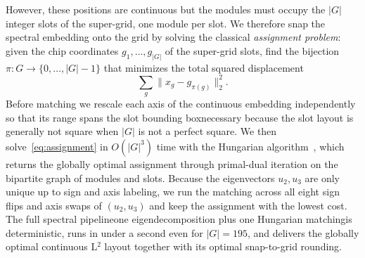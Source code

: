 However, these positions are continuous but the modules must occupy the $|G|$ integer slots of the super-grid, one module per slot. We therefore snap the spectral embedding onto the grid by solving the classical \emph{assignment problem}: given the chip coordinates $g_1, \ldots, g_{|G|}$ of the super-grid slots, find the bijection $\pi : G \to \{0, \ldots, |G|-1\}$ that minimizes the total squared displacement
\begin{equation}
    \sum_g \bigl\lVert x_g - g_{\pi(g)}\bigr\rVert_2^2.
    \label{eq:assignment}
\end{equation}
Before matching we rescale each axis of the continuous embedding independently so that its range spans the slot bounding box\textemdash necessary because the slot layout is generally not square when $|G|$ is not a perfect square. We then solve~\eqref{eq:assignment} in $O(|G|^3)$ time with the Hungarian algorithm~\cite{hungarian}, which returns the globally optimal assignment through primal-dual iteration on the bipartite graph of modules and slots. Because the eigenvectors $u_2, u_3$ are only unique up to sign and axis labeling, we run the matching across all eight sign flips and axis swaps of $(u_2, u_3)$ and keep the assignment with the lowest cost. The full spectral pipeline\textemdash one eigendecomposition plus one Hungarian matching\textemdash is deterministic, runs in under a second even for $|G|=195$, and delivers the globally optimal continuous L$^2$ layout together with its optimal snap-to-grid rounding.
